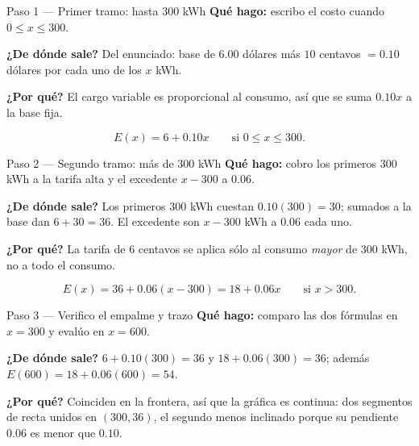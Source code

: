\documentclass[11pt]{article}
\begin{document}
\begin{paso}{Paso 1 --- Primer tramo: hasta 300 kWh}
\textbf{Qué hago:} escribo el costo cuando $0\le x\le 300$.

\textbf{¿De dónde sale?} Del enunciado: base de $6.00$ dólares más $10$ centavos $=0.10$ dólares por cada uno de los $x$ kWh.

\textbf{¿Por qué?} El cargo variable es proporcional al consumo, así que se suma $0.10x$ a la base fija.

\[
E(x)=6+0.10x \qquad \text{si } 0\le x\le 300.
\]
\end{paso}

\begin{paso}{Paso 2 --- Segundo tramo: más de 300 kWh}
\textbf{Qué hago:} cobro los primeros $300$ kWh a la tarifa alta y el excedente $x-300$ a $0.06$.

\textbf{¿De dónde sale?} Los primeros $300$ kWh cuestan $0.10(300)=30$; sumados a la base dan $6+30=36$. El excedente son $x-300$ kWh a $0.06$ cada uno.

\textbf{¿Por qué?} La tarifa de $6$ centavos se aplica sólo al consumo \emph{mayor} de $300$ kWh, no a todo el consumo.

\[
E(x)=36+0.06(x-300)=18+0.06x \qquad \text{si } x>300.
\]
\end{paso}

\begin{paso}{Paso 3 --- Verifico el empalme y trazo}
\textbf{Qué hago:} comparo las dos fórmulas en $x=300$ y evalúo en $x=600$.

\textbf{¿De dónde sale?} $6+0.10(300)=36$ y $18+0.06(300)=36$; además $E(600)=18+0.06(600)=54$.

\textbf{¿Por qué?} Coinciden en la frontera, así que la gráfica es continua: dos segmentos de recta unidos en $(300,36)$, el segundo menos inclinado porque su pendiente $0.06$ es menor que $0.10$.

\begin{center}
\end{center}
\end{paso}
\end{document}
